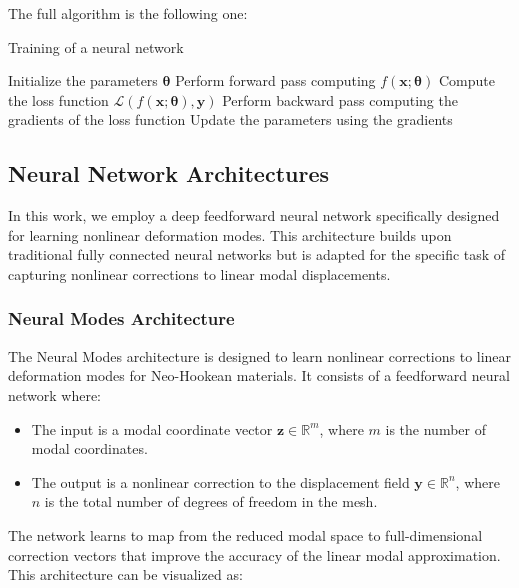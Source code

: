The full algorithm is the following one:
\begin{algorithm} 
    \caption{Training of a neural network}
    \begin{algorithmic}
        \State Initialize the parameters \( \bm{\theta} \)
                \State Perform forward pass computing \( f(\bm{x}; \bm{\theta}) \)
                \State Compute the loss function \( \mathcal{L}(f(\bm{x}; \bm{\theta}), \bm{y}) \)
                \State Perform backward pass computing the gradients of the loss function
                \State Update the parameters using the gradients
            \EndFor
        \EndWhile
    \end{algorithmic}
\end{algorithm}

\subsection{Neural Network Architectures}
In this work, we employ a deep feedforward neural network specifically designed for learning nonlinear deformation modes. This architecture builds upon traditional fully connected neural networks but is adapted for the specific task of capturing nonlinear corrections to linear modal displacements.

\subsubsection{Neural Modes Architecture}
The Neural Modes architecture is designed to learn nonlinear corrections to linear deformation modes for Neo-Hookean materials. It consists of a feedforward neural network where:

\begin{itemize}
    \item The input is a modal coordinate vector \( \bm{z} \in \mathbb{R}^m \), where $m$ is the number of modal coordinates.
    \item The output is a nonlinear correction to the displacement field \( \bm{y} \in \mathbb{R}^n \), where $n$ is the total number of degrees of freedom in the mesh.
\end{itemize}

The network learns to map from the reduced modal space to full-dimensional correction vectors that improve the accuracy of the linear modal approximation. This architecture can be visualized as:


